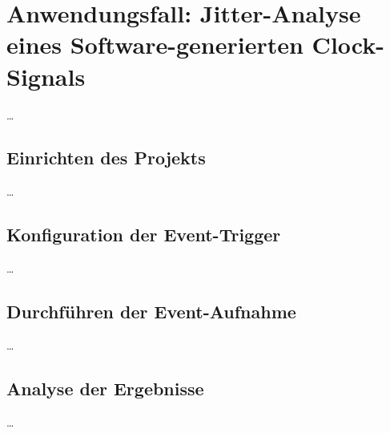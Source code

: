 \chapter{Anwendungsfall: Jitter-Analyse eines Software-generierten Clock-Signals}
\label{ch:Anwendungsfall}
\ldots

\section{Einrichten des Projekts}
\label{ch:Anwendungsfall:sec:Einrichten}

\ldots


\section{Konfiguration der Event-Trigger}
\label{ch:Anwendungsfall:sec:Event-Trigger}

\ldots
\clearpage


\section{Durchf\"uhren der Event-Aufnahme}
\label{ch:Anwendungsfall:sec:Durchf\"uhrung}

\ldots


\section{Analyse der Ergebnisse}
\label{ch:Anwendungsfall:sec:Analyse}

\ldots


